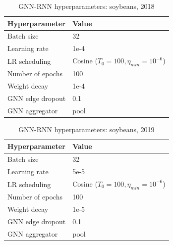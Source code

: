 %
\begin{table}[H]
\centering
\begin{tabular}{|l|l|} \hline
\textbf{Hyperparameter} & \textbf{Value} \\ \hline
Batch size & 32 \\ \hline
Learning rate & 1e-4 \\ \hline
LR scheduling & Cosine ($T_0 = 100, \eta_{min} = 10^{-6}$)  \\ \hline
Number of epochs & 100 \\ \hline
Weight decay & 1e-4 \\ \hline
GNN edge dropout & 0.1 \\ \hline
GNN aggregator & pool \\ \hline
\end{tabular}
\caption{GNN-RNN hyperparameters: soybeans, 2018}
\label{hyperparams_gnn_soybeans, 2018}
\end{table}

\begin{table}[H]
\centering
\begin{tabular}{|l|l|} \hline
\textbf{Hyperparameter} & \textbf{Value} \\ \hline
Batch size & 32 \\ \hline
Learning rate & 5e-5 \\ \hline
LR scheduling & Cosine ($T_0 = 100, \eta_{min} = 10^{-6}$)  \\ \hline
Number of epochs & 100 \\ \hline
Weight decay & 1e-5 \\ \hline
GNN edge dropout & 0.1 \\ \hline
GNN aggregator & pool \\ \hline
\end{tabular}
\caption{GNN-RNN hyperparameters: soybeans, 2019}
\label{hyperparams_gnn_soybeans, 2019}
\end{table}


